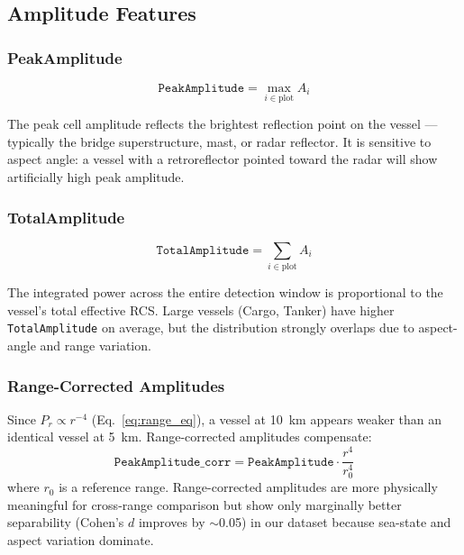 \documentclass[journal]{IEEEtran}
\begin{document}
\subsection{Amplitude Features}
\label{sec:amplitude}

\subsubsection{PeakAmplitude}

\begin{equation}
  \texttt{PeakAmplitude} = \max_{i \in \text{plot}} A_i
\end{equation}

The peak cell amplitude reflects the brightest reflection point on the vessel —
typically the bridge superstructure, mast, or radar reflector. It is sensitive
to aspect angle: a vessel with a retroreflector pointed toward the radar
will show artificially high peak amplitude.

\subsubsection{TotalAmplitude}

\begin{equation}
  \texttt{TotalAmplitude} = \sum_{i \in \text{plot}} A_i
\end{equation}

The integrated power across the entire detection window is proportional to
the vessel's total effective RCS. Large vessels (Cargo, Tanker) have higher
\texttt{TotalAmplitude} on average, but the distribution strongly overlaps
due to aspect-angle and range variation.

\subsubsection{Range-Corrected Amplitudes}

Since $P_r \propto r^{-4}$ (Eq.~\ref{eq:range_eq}), a vessel at 10~km appears
weaker than an identical vessel at 5~km. Range-corrected amplitudes compensate:
\begin{equation}
  \texttt{PeakAmplitude\_corr} = \texttt{PeakAmplitude} \cdot \frac{r^4}{r_0^4}
\end{equation}
where $r_0$ is a reference range. Range-corrected amplitudes are more physically
meaningful for cross-range comparison but show only marginally better separability
(Cohen's $d$ improves by $\sim$0.05) in our dataset because sea-state and
aspect variation dominate.
\end{document}
